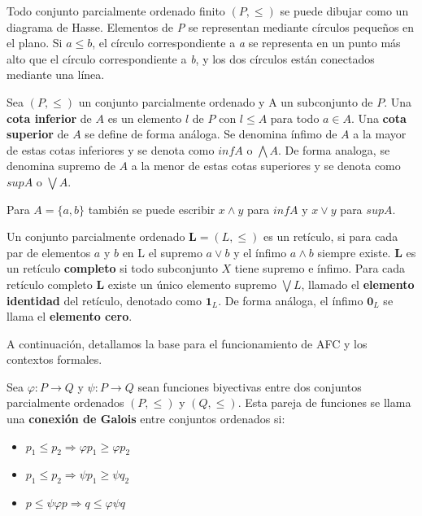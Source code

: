 \documentclass[../../main.tex]{subfiles}
\begin{document}
Todo conjunto parcialmente ordenado finito $(P,\leq)$ se puede dibujar como un diagrama de Hasse. 
Elementos de \textit{P} se representan mediante círculos pequeños en el plano. Si $a \leq b$, el círculo correspondiente a \textit{a} se representa en un punto más alto que el círculo correspondiente a \textit{b}, y los dos círculos están conectados mediante una línea. 


\begin{definicion}
Sea $(P,\leq)$ un conjunto parcialmente ordenado y A un subconjunto de $P$. Una \textbf{cota inferior} de $A$ es un elemento $l$ de $P$ con $l \leq A$ para todo $a \in A$. Una \textbf{cota superior} de $A$ se define de forma análoga. Se denomina ínfimo de $A$ a la mayor de estas cotas inferiores y se denota como $inf A$ o $\bigwedge A$. De forma analoga, se denomina supremo de $A$ a la menor de estas cotas superiores y se denota como $sup A$ o $\bigvee A$.
\end{definicion}

Para $A = {\{a,b\}}$ también se puede escribir $x \wedge y$ para $inf A$ y $x \vee y$ para $sup A$.


\begin{definicion}
Un conjunto parcialmente ordenado $\textbf{L} = (L, \leq)$ es un retículo, si para cada par de elementos $a$ y $b$ en L el supremo $a \vee b$ y el ínfimo $a \wedge b$ siempre existe. $\textbf{L}$ es un retículo \textbf{completo} si todo subconjunto $X$ tiene supremo e ínfimo. Para cada retículo completo $\textbf{L}$ existe un único elemento supremo $\bigvee L$, llamado el \textbf{elemento identidad} del retículo, denotado como $\textbf{1}_L$. De forma análoga, el ínfimo $\textbf{0}_L$ se llama el \textbf{elemento cero}.
\end{definicion}

A continuación, detallamos la base para el funcionamiento de AFC y los contextos formales.

\begin{definicion}
Sea $\varphi : P \rightarrow Q$ y $\psi : P \rightarrow Q$ sean funciones biyectivas entre dos conjuntos parcialmente ordenados $(P,\leq)$ y $(Q,\leq)$. Esta pareja de funciones se llama una \textbf{conexión de Galois} entre conjuntos ordenados si:
\begin{itemize}
    \item $p_1 \leq p_2 \Longrightarrow \varphi p_1 \geq \varphi p_2$
    \item $p_1 \leq p_2 \Longrightarrow \psi p_1 \geq \psi q_2$
    \item $p \leq \psi \varphi p \Longrightarrow q \leq \varphi \psi q$
\end{itemize}
\end{definicion}
\end{document}
